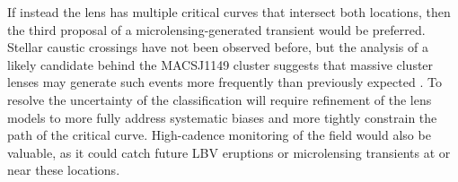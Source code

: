 If instead the  lens has multiple critical curves that
intersect both \spock locations, then the third proposal of a
microlensing-generated transient would be preferred.  Stellar caustic
crossings have not been observed before, but the analysis of a likely
candidate behind the MACSJ1149 cluster suggests that massive cluster
lenses may generate such events more frequently than previously
expected \citep{Kelly:2017}. To resolve the uncertainty of the \spock
classification will require refinement of the lens models to more
fully address systematic biases and more tightly constrain the path of
the critical curve.  High-cadence monitoring of the  field
would also be valuable, as it could catch future LBV eruptions or
microlensing transients at or near these locations.

